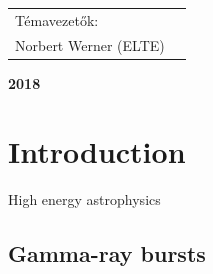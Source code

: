 \documentclass[12pt, a4paper,titlepage]{article}
\numberwithin{equation}{section}
\numberwithin{figure}{section}
\begin{document}
\begin{titlepage}
\begin{center}
\vspace{4 cm}
\end{center}

\begin{center}
\begin{tabular}{ll}
\centerline{ Témavezetők: } \\
\centerline{ Norbert Werner (ELTE)}
\end{tabular}
\end{center}
\begin{center}

\vspace{2.5 cm}
\large \textbf {2018}\\
\end{center}
\end{titlepage}
\tableofcontents
{}



\pagebreak
{}
\setcounter{page}{1}




\section{Introduction}

High energy astrophysics

\subsection{Gamma-ray bursts}
\end{document}
